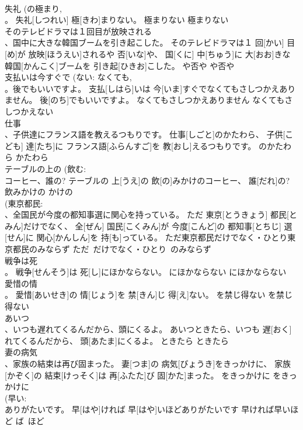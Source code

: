 \documentclass[8pt]{extreport}
\begin{document}
\begin{CJK}{UTF8}{min}
\\	失礼 (の極まり, 
\\	。	失礼[しつれい] 極[きわ]まりない。	極まりない	極まりない	
\\	そのテレビドラマは１回目が放映される 
\\	、国中に大きな韓国ブームを引き起こした。	そのテレビドラマは１ 回[かい] 目[め]が 放映[ほうえい]されるや 否[いな]や、 国[くに] 中[ちゅう]に 大[おお]きな 韓国[かんこく]ブームを 引き起[ひきお]こした。	や否や	や否や	
\\	支払いは今すぐで (ない: なくても, 
\\	。後でもいいですよ。	支払[しはら]いは 今[いま]すぐでなくてもさしつかえありません。 後[のち]でもいいですよ。	なくてもさしつかえありません	なくてもさしつかえない	
\\	仕事 
\\	、子供達にフランス語を教えるつもりです。	仕事[しごと]のかたわら、 子供[こども] 達[たち]に フランス語[ふらんすご]を 教[おし]えるつもりです。	のかたわら	かたわら	
\\	テーブルの上の (飲む: 
\\	コーヒー、誰の?	テーブルの 上[うえ]の 飲[の]みかけのコーヒー、 誰[だれ]の?	飲みかけの	かけの~	
\\	(東京都民: 
\\	、全国民が今度の都知事選に関心を持っている。	ただ 東京[とうきょう] 都民[とみん]だけでなく、 全[ぜん] 国民[こくみん]が 今度[こんど]の 都知事[とちじ] 選[せん]に 関心[かんしん]を 持[も]っている。	ただ東京都民だけでなく・ひとり東京都民のみならず	ただ~だけでなく・ひとり~のみならず	
\\	戦争は死 
\\	。	戦争[せんそう]は 死[し]にほかならない。	にほかならない	にほかならない	
\\	愛惜の情 
\\	。	愛惜[あいせき]の 情[じょう]を 禁[きん]じ 得[え]ない。	を禁じ得ない	を禁じ得ない	
\\	あいつ 
\\	、いつも遅れてくるんだから、頭にくるよ。	あいつときたら、いつも 遅[おく]れてくるんだから、 頭[あたま]にくるよ。	ときたら	ときたら	
\\	妻の病気 
\\	、家族の結束は再び固まった。	妻[つま]の 病気[びょうき]をきっかけに、 家族[かぞく]の 結束[けっそく]は 再[ふたた]び 固[かた]まった。	をきっかけに	をきっかけに	
\\	(早い: 
\\	ありがたいです。	早[はや]ければ 早[はや]いほどありがたいです	早ければ早いほど	ば~ほど	

\end{CJK}
\end{document}
